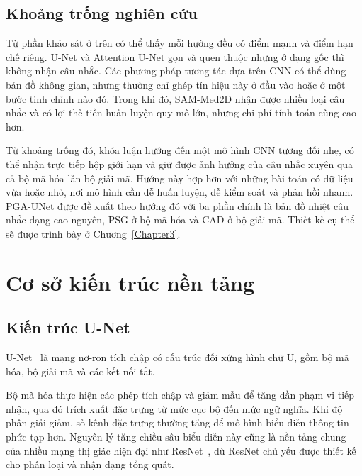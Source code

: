 \subsection{Khoảng trống nghiên cứu}

Từ phần khảo sát ở trên có thể thấy mỗi hướng đều có điểm mạnh và điểm hạn chế riêng. U-Net và Attention U-Net gọn và quen thuộc nhưng ở dạng gốc thì không nhận câu nhắc. Các phương pháp tương tác dựa trên CNN có thể dùng bản đồ không gian, nhưng thường chỉ ghép tín hiệu này ở đầu vào hoặc ở một bước tinh chỉnh nào đó. Trong khi đó, SAM-Med2D nhận được nhiều loại câu nhắc và có lợi thế tiền huấn luyện quy mô lớn, nhưng chi phí tính toán cũng cao hơn.

Từ khoảng trống đó, khóa luận hướng đến một mô hình CNN tương đối nhẹ, có thể nhận trực tiếp hộp giới hạn và giữ được ảnh hưởng của câu nhắc xuyên qua cả bộ mã hóa lẫn bộ giải mã. Hướng này hợp hơn với những bài toán có dữ liệu vừa hoặc nhỏ, nơi mô hình cần dễ huấn luyện, dễ kiểm soát và phản hồi nhanh. PGA-UNet được đề xuất theo hướng đó với ba phần chính là bản đồ nhiệt câu nhắc dạng cao nguyên, PSG ở bộ mã hóa và CAD ở bộ giải mã. Thiết kế cụ thể sẽ được trình bày ở Chương~\ref{Chapter3}.

\section{Cơ sở kiến trúc nền tảng}
\label{sec:cnn}

\subsection{Kiến trúc U-Net}
\label{subsec:unet}

U-Net~\cite{ronneberger2015unet} là mạng nơ-ron tích chập có cấu trúc đối xứng hình chữ U, gồm bộ mã hóa, bộ giải mã và các kết nối tắt.

Bộ mã hóa thực hiện các phép tích chập và giảm mẫu để tăng dần phạm vi tiếp nhận, qua đó trích xuất đặc trưng từ mức cục bộ đến mức ngữ nghĩa. Khi độ phân giải giảm, số kênh đặc trưng thường tăng để mô hình biểu diễn thông tin phức tạp hơn. Nguyên lý tăng chiều sâu biểu diễn này cũng là nền tảng chung của nhiều mạng thị giác hiện đại như ResNet~\cite{he2016resnet}, dù ResNet chủ yếu được thiết kế cho phân loại và nhận dạng tổng quát.

